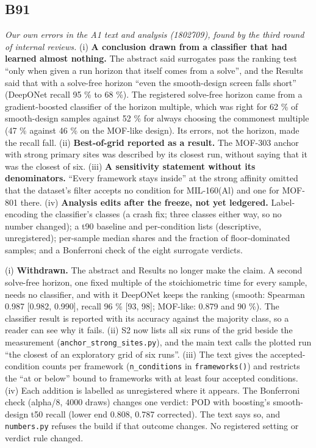 \documentclass[10pt]{article}
\begin{document}
\subsection*{B91}\label{led:B91}
\begin{description}[leftmargin=0pt,itemsep=1pt]
\item[Defect.] \emph{Our own errors in the A1 text and analysis (1802709), found by the third round of internal reviews.} (i) \textbf{A conclusion drawn from a classifier that had learned almost nothing.} The abstract said surrogates pass the ranking test ``only when given a run horizon that itself comes from a solve'', and the Results said that with a solve-free horizon ``even the smooth-design screen falls short'' (DeepONet recall 95 \% to 68 \%). The registered solve-free horizon came from a gradient-boosted classifier of the horizon multiple, which was right for 62 \% of smooth-design samples against 52 \% for always choosing the commonest multiple (47 \% against 46 \% on the MOF-like design). Its errors, not the horizon, made the recall fall. (ii) \textbf{Best-of-grid reported as a result.} The MOF-303 anchor with strong primary sites was described by its closest run, without saying that it was the closest of six. (iii) \textbf{A sensitivity statement without its denominators.} ``Every framework stays inside'' at the strong affinity omitted that the dataset's filter accepts no condition for MIL-160(Al) and one for MOF-801 there. (iv) \textbf{Analysis edits after the freeze, not yet ledgered.} Label-encoding the classifier's classes (a crash fix; three classes either way, so no number changed); a t90 baseline and per-condition lists (descriptive, unregistered); per-sample median shares and the fraction of floor-dominated samples; and a Bonferroni check of the eight surrogate verdicts.
\item[Resolution.] (i) \textbf{Withdrawn.} The abstract and Results no longer make the claim. A second solve-free horizon, one fixed multiple of the stoichiometric time for every sample, needs no classifier, and with it DeepONet keeps the ranking (smooth: Spearman 0.987 [0.982, 0.990], recall 96 \% [93, 98]; MOF-like: 0.879 and 90 \%). The classifier result is reported with its accuracy against the majority class, so a reader can see why it fails. (ii) S2 now lists all six runs of the grid beside the measurement (\texttt{anchor\_strong\_sites.py}), and the main text calls the plotted run ``the closest of an exploratory grid of six runs''. (iii) The text gives the accepted-condition counts per framework (\texttt{n\_conditions} in \texttt{frameworks()}) and restricts the ``at or below'' bound to frameworks with at least four accepted conditions. (iv) Each addition is labelled as unregistered where it appears. The Bonferroni check (alpha/8, 4000 draws) changes one verdict: POD with boosting's smooth-design t50 recall (lower end 0.808, 0.787 corrected). The text says so, and \texttt{numbers.py} refuses the build if that outcome changes. No registered setting or verdict rule changed.

\end{description}
\end{document}
